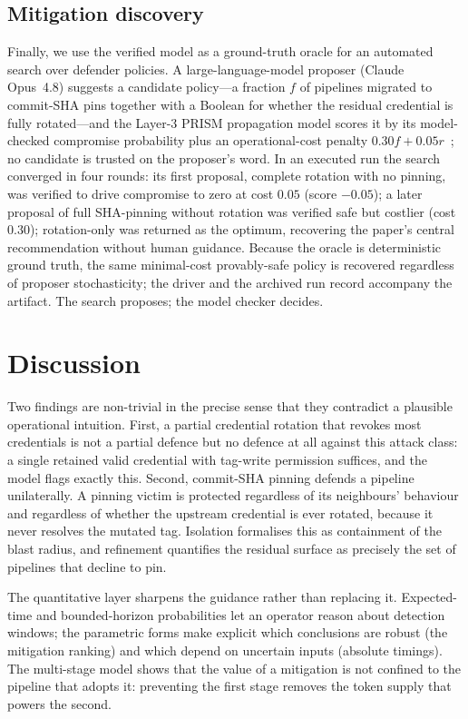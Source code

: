 \documentclass[letterpaper,twocolumn,10pt]{article}
\begin{document}
\subsection{Mitigation discovery}
Finally, we use the verified model as a ground-truth oracle for an automated search over defender policies. A large-language-model proposer (Claude Opus~4.8) suggests a candidate policy---a fraction $f$ of pipelines migrated to commit-SHA pins together with a Boolean for whether the residual credential is fully rotated---and the Layer-3 PRISM propagation model scores it by its model-checked compromise probability plus an operational-cost penalty $0.30f + 0.05r$~\cite{sonatype}; no candidate is trusted on the proposer's word. In an executed run the search converged in four rounds: its first proposal, complete rotation with no pinning, was verified to drive compromise to zero at cost $0.05$ (score $-0.05$); a later proposal of full SHA-pinning without rotation was verified safe but costlier (cost $0.30$); rotation-only was returned as the optimum, recovering the paper's central recommendation without human guidance. Because the oracle is deterministic ground truth, the same minimal-cost provably-safe policy is recovered regardless of proposer stochasticity; the driver and the archived run record accompany the artifact. The search proposes; the model checker decides.

\section{Discussion}
Two findings are non-trivial in the precise sense that they contradict a plausible operational intuition. First, a partial credential rotation that revokes most credentials is not a partial defence but no defence at all against this attack class: a single retained valid credential with tag-write permission suffices, and the model flags exactly this. Second, commit-SHA pinning defends a pipeline unilaterally. A pinning victim is protected regardless of its neighbours' behaviour and regardless of whether the upstream credential is ever rotated, because it never resolves the mutated tag. Isolation formalises this as containment of the blast radius, and refinement quantifies the residual surface as precisely the set of pipelines that decline to pin.

The quantitative layer sharpens the guidance rather than replacing it. Expected-time and bounded-horizon probabilities let an operator reason about detection windows; the parametric forms make explicit which conclusions are robust (the mitigation ranking) and which depend on uncertain inputs (absolute timings). The multi-stage model shows that the value of a mitigation is not confined to the pipeline that adopts it: preventing the first stage removes the token supply that powers the second.
\end{document}
